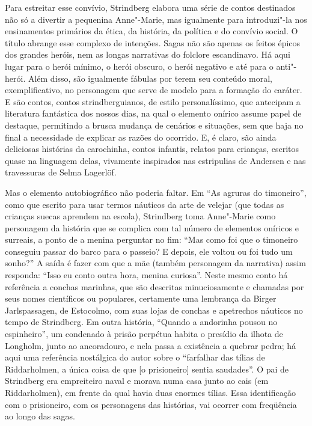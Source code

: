 Para estreitar esse convívio, Strindberg elabora uma série de contos
destinados não só a divertir a pequenina Anne"-Marie, mas igualmente
para introduzi"-la nos ensinamentos primários da ética, da história,
da política e do convívio social. O título abrange esse complexo de
intenções. Sagas não são apenas os feitos épicos dos grandes heróis,
nem as longas narrativas do folclore escandinavo. Há aqui lugar para o
herói mínimo, o herói obscuro, o herói negativo e até para o
anti"-herói. Além disso, são igualmente fábulas por terem seu conteúdo
moral, exemplificativo, no personagem que serve de modelo para a
formação do caráter. E são contos, contos strindberguianos, de estilo
personalíssimo, que antecipam a literatura fantástica dos nossos dias,
na qual o elemento onírico assume papel de destaque, permitindo a
brusca mudança de cenários e situações, sem que haja no final a
necessidade de explicar as razões do ocorrido. E, é claro, são ainda
deliciosas histórias da carochinha, contos infantis, relatos para
crianças, escritos quase na linguagem delas, vivamente inspirados nas
estripulias de Andersen e nas travessuras de Selma Lagerlöf.

Mas o elemento autobiográfico não poderia faltar. Em ``As agruras
do timoneiro'', como que escrito para usar termos náuticos da arte de
velejar (que todas as crianças suecas aprendem na escola), Strindberg
toma Anne"-Marie como personagem da história que se complica com tal
número de elementos oníricos e surreais, a ponto de a menina perguntar
no fim: ``Mas como foi que o timoneiro conseguiu passar do barco para o
passeio? E depois, ele voltou ou foi tudo um sonho?'' A saída é fazer
com que a mãe (também personagem da narrativa) assim responda: ``Isso eu
conto outra hora, menina curiosa''. Neste mesmo conto há referência a
conchas marinhas, que são descritas minuciosamente e chamadas por seus
nomes científicos ou populares, certamente uma lembrança da Birger
Jarlspassagen, de Estocolmo, com suas lojas de conchas e apetrechos
náuticos no tempo de Strindberg. Em outra história, ``Quando a
andorinha pousou no espinheiro'',  um condenado à prisão perpétua habita
o presídio da ilhota de Longholm, junto ao ancoradouro, e nela passa a
existência a quebrar pedra; há aqui uma referência nostálgica do autor
sobre o ``farfalhar das tílias de Riddarholmen, a única coisa de que [o
prisioneiro] sentia saudades''. O pai de Strindberg era empreiteiro
naval e morava numa casa junto ao cais (em Riddarholmen), em frente da
qual havia duas enormes tílias. Essa identificação com o prisioneiro,
com os personagens das histórias, vai ocorrer com freqüência ao longo
das sagas. 

